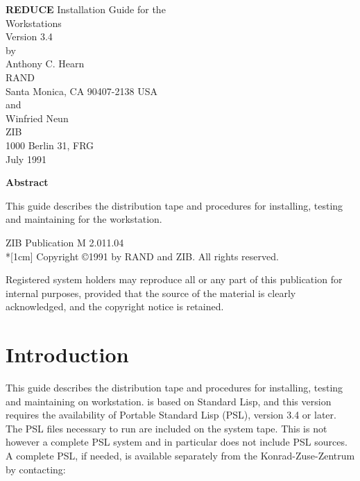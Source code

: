 \begin{titlepage}
\samepage
\begin{center}
\begin{minipage}{10cm}
\begin{center}
{\LARGE {\bf REDUCE} Installation Guide for the} \vspace*{2mm} \\
{\LARGE {\system} Workstations} \\[0.3cm]
{\LARGE Version 3.4} \\[0.3cm]
{\large by} \\[0.3cm]
{\Large Anthony C. Hearn}\\
{\large RAND} \\
{\large Santa Monica, CA 90407-2138 USA} \\[0.3cm]
{\large and} \\[0.3cm]
{\Large Winfried Neun}\\
{\large ZIB} \\
{\large 1000 Berlin 31, FRG} \\[0.3cm]
{\large July 1991}\\[0.5cm]
\vfill

{\bf Abstract}
\end{center}
\end{minipage}
\end{center}
This guide describes the {\REDUCE} distribution tape and procedures for
installing, testing and maintaining {\REDUCE} for the {\system} workstation.

\begin{center}
{ZIB Publication M 2.011.04} \\*[1cm]
Copyright \copyright 1991 by RAND and ZIB.  All rights reserved.
\end{center}

\nopagebreak
Registered system holders may reproduce all or any part of this
publication for internal purposes, provided that the source of the
material is clearly acknowledged, and the copyright notice is retained.
\end{titlepage}
\newpage
\tableofcontents
\thispagestyle{empty}

\newpage
\setcounter{page}{1}
\pagestyle{plain}

\section{Introduction}
This guide describes the {\REDUCE} distribution tape and procedures for
installing, testing and maintaining {\REDUCE} on {\system} workstation.
{\REDUCE} is based on Standard Lisp, and this version requires the
availability of Portable Standard Lisp (PSL), version 3.4 or later.  The
PSL files necessary to run {\REDUCE} are included on the system tape.  This
is not however a complete PSL system and in particular does not include
PSL sources.  A complete PSL, if needed, is available separately from the
Konrad-Zuse-Zentrum by contacting:

